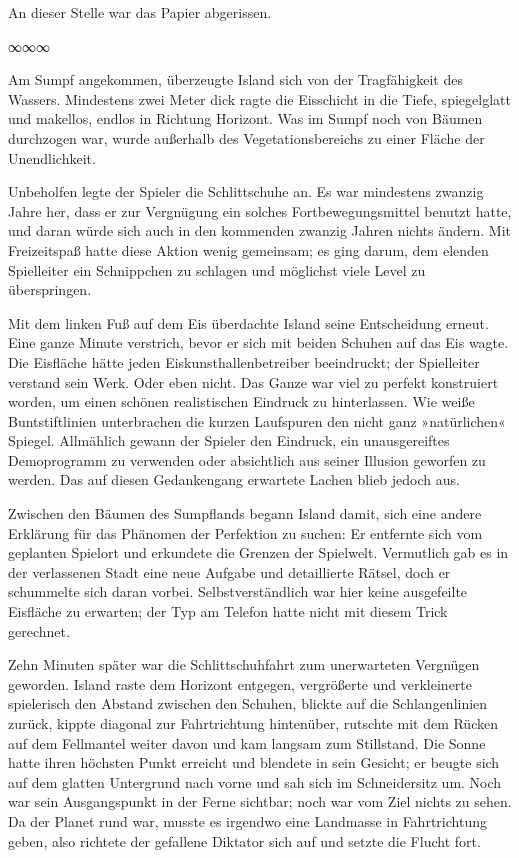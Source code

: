 An dieser Stelle war das Papier abgerissen.

\begin{center}
∞∞∞
\end{center}

Am Sumpf angekommen, überzeugte Island sich von der Tragfähigkeit des Wassers. Mindestens zwei Meter dick ragte die Eisschicht in die Tiefe, spiegelglatt und makellos, endlos in Richtung Horizont. Was im Sumpf noch von Bäumen durchzogen war, wurde außerhalb des Vegetationsbereichs zu einer Fläche der Unendlichkeit.

Unbeholfen legte der Spieler die Schlittschuhe an. Es war mindestens zwanzig Jahre her, dass er zur Vergnügung ein solches Fortbewegungsmittel benutzt hatte, und daran würde sich auch in den kommenden zwanzig Jahren nichts ändern. Mit Freizeitspaß hatte diese Aktion wenig gemeinsam; es ging darum, dem elenden Spielleiter ein Schnippchen zu schlagen und möglichst viele Level zu überspringen.

Mit dem linken Fuß auf dem Eis überdachte Island seine Entscheidung erneut. Eine ganze Minute verstrich, bevor er sich mit beiden Schuhen auf das Eis wagte. Die Eisfläche hätte jeden Eiskunsthallenbetreiber beeindruckt; der Spielleiter verstand sein Werk. Oder eben nicht. Das Ganze war viel zu perfekt konstruiert worden, um einen schönen realistischen Eindruck zu hinterlassen. Wie weiße Buntstiftlinien unterbrachen die kurzen Laufspuren den nicht ganz »natürlichen« Spiegel. Allmählich gewann der Spieler den Eindruck, ein unausgereiftes Demoprogramm zu verwenden oder absichtlich aus seiner Illusion geworfen zu werden. Das auf diesen Gedankengang erwartete Lachen blieb jedoch aus.

Zwischen den Bäumen des Sumpflands begann Island damit, sich eine andere Erklärung für das Phänomen der Perfektion zu suchen: Er entfernte sich vom geplanten Spielort und erkundete die Grenzen der Spielwelt. Vermutlich gab es in der verlassenen Stadt eine neue Aufgabe und detaillierte Rätsel, doch er schummelte sich daran vorbei. Selbstverständlich war hier keine ausgefeilte Eisfläche zu erwarten; der Typ am Telefon hatte nicht mit diesem Trick gerechnet.

Zehn Minuten später war die Schlittschuhfahrt zum unerwarteten Vergnügen geworden. Island raste dem Horizont entgegen, vergrößerte und verkleinerte spielerisch den Abstand zwischen den Schuhen, blickte auf die Schlangenlinien zurück, kippte diagonal zur Fahrtrichtung hintenüber, rutschte mit dem Rücken auf dem Fellmantel weiter davon und kam langsam zum Stillstand. Die Sonne hatte ihren höchsten Punkt erreicht und blendete in sein Gesicht; er beugte sich auf dem glatten Untergrund nach vorne und sah sich im Schneidersitz um. Noch war sein Ausgangspunkt in der Ferne sichtbar; noch war vom Ziel nichts zu sehen. Da der Planet rund war, musste es irgendwo eine Landmasse in Fahrtrichtung geben, also richtete der gefallene Diktator sich auf und setzte die Flucht fort.

